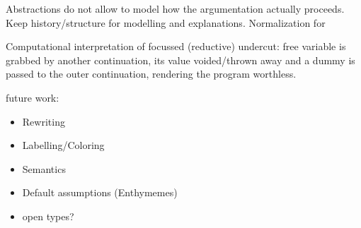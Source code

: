 \documentclass{ecai}
\begin{document}
\begin{scratch}
  Abstractions do not allow to model how the argumentation actually proceeds. Keep history/structure for modelling and explanations. Normalization for

  Computational interpretation of focussed (reductive) undercut: free variable is grabbed by another continuation, its value voided/thrown away and a dummy is passed to the outer continuation, rendering the program worthless.

  future work:

  \begin{itemize}
  \item Rewriting
  \item Labelling/Coloring
  \item Semantics
  \item Default assumptions (Enthymemes)
  \item open types?
  \end{itemize}
  
\end{scratch}
\end{document}
